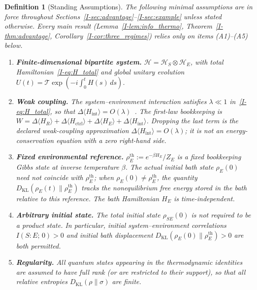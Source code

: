 \documentclass[12pt,a4paper,openany]{book}
\newtheorem{definition}[theorem]{Definition}
\begin{document}
\begin{definition}[Standing Assumptions]
\label{I-def:assumptions}
The following minimal assumptions are in force throughout
Sections~\ref{I-sec:advantage}--\ref{I-sec:example} unless
stated otherwise.
Every main result
(Lemma~\ref{I-lem:info_thermo},
Theorem~\ref{I-thm:advantage},
Corollary~\ref{I-cor:three_regimes})
relies \emph{only} on items
\textup{(A1)--(A5)} below.
\begin{enumerate}
\item[\textup{(A1)}]
  \textbf{Finite-dimensional bipartite system.}
  $\mathcal{H} = \mathcal{H}_S \otimes \mathcal{H}_E$,
  with total Hamiltonian~\eqref{I-eq:H_total}
  and global unitary evolution
  $U(t) = \mathcal{T}\exp(-i\int_0^t H(s)\,ds)$.

\item[\textup{(A2)}]
  \textbf{Weak coupling.}
  The system--environment interaction satisfies
  $\lambda \ll 1$ in~\eqref{I-eq:H_total}, so that
  $\Delta\langle H_{\mathrm{int}} \rangle
  = O(\lambda)$~\cite{BreuerPetruccione2002}.
  The first-law bookkeeping is
  $W=\Delta\langle H_R\rangle
  + \Delta\langle H_{\mathrm{ctrl}}\rangle
  + \Delta\langle H_E\rangle
  + \Delta\langle H_{\mathrm{int}}\rangle$.
  Dropping the last term is the declared weak-coupling approximation
  $\Delta\langle H_{\mathrm{int}}\rangle=O(\lambda)$; it is not
  an energy-conservation equation with a zero right-hand side.

\item[\textup{(A3)}]
  \textbf{Fixed environmental reference.}
  $\rho_E^{\mathrm{th}} := e^{-\beta H_E}/Z_E$
  is a fixed \emph{bookkeeping} Gibbs state at inverse
  temperature $\beta$.
  The \emph{actual} initial bath state $\rho_E(0)$
  need not coincide with $\rho_E^{\mathrm{th}}$;
  when $\rho_E(0) \neq \rho_E^{\mathrm{th}}$, the quantity
  $D_{\mathrm{KL}}(\rho_E(t)\|\rho_E^{\mathrm{th}})$
  tracks the nonequilibrium free energy stored in the bath
  relative to this reference.
  The bath Hamiltonian $H_E$ is time-independent.

\item[\textup{(A4)}]
  \textbf{Arbitrary initial state.}
  The total initial state $\rho_{SE}(0)$ is \emph{not}
  required to be a product state.
  In particular, initial system--environment correlations
  $I(S{:}E;\,0) > 0$ and initial bath displacement
  $D_{\mathrm{KL}}(\rho_E(0)\|\rho_E^{\mathrm{th}}) > 0$
  are both permitted.
\item[\textup{(A5)}]
  \textbf{Regularity.}
  All quantum states appearing in the thermodynamic
  identities are assumed to have full rank (or are
  restricted to their support), so that all relative
  entropies $D_{\mathrm{KL}}(\rho\|\sigma)$ are finite.
\end{enumerate}
\end{definition}
\end{document}

